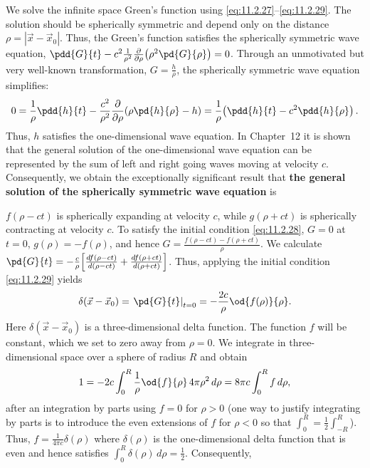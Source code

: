 We solve the infinite space Green's function using \eqref{eq:11.2.27}--\eqref{eq:11.2.29}.  The solution should be spherically symmetric and depend only on the distance $\rho = |\vec{x} - \vec{x}_0|$.  Thus, the Green's function satisfies the spherically symmetric wave equation, $\pdd{G}{t} - c^2 \frac{1}{\rho^2}\frac{\partial}{\partial \rho}\!\left(\rho^2\pd{G}{\rho}\right) = 0$.  Through an unmotivated but very well-known transformation, $G = \frac{h}{\rho}$, the spherically symmetric wave equation simplifies:
\[
0 = \frac{1}{\rho}\pdd{h}{t} - \frac{c^2}{\rho^2}\frac{\partial}{\partial \rho}\!\left(\rho\pd{h}{\rho} - h\right) = \frac{1}{\rho}\!\left(\pdd{h}{t} - c^2\pdd{h}{\rho}\right).
\]
Thus, $h$ satisfies the one-dimensional wave equation.  In Chapter~12 it is shown that the general solution of the one-dimensional wave equation can be represented by the sum of left and right going waves moving at velocity $c$.  Consequently, we obtain the exceptionally significant result that \textbf{the general solution of the spherically symmetric wave equation} is

$f(\rho - ct)$ is spherically expanding at velocity $c$, while $g(\rho + ct)$ is spherically contracting at velocity $c$.  To satisfy the initial condition \eqref{eq:11.2.28}, $G = 0$ at $t = 0$, $g(\rho) = -f(\rho)$, and hence $G = \frac{f(\rho - ct) - f(\rho + ct)}{\rho}$.  We calculate $\pd{G}{t} = -\frac{c}{\rho}\!\left[\frac{df(\rho - ct)}{d(\rho - ct)} + \frac{df(\rho + ct)}{d(\rho + ct)}\right]$.  Thus, applying the initial condition \eqref{eq:11.2.29} yields
\[
\delta(\vec{x} - \vec{x}_0) = \left.\pd{G}{t}\right|_{t=0} = -\frac{2c}{\rho}\od{f(\rho)}{\rho}.
\]
Here $\delta(\vec{x} - \vec{x}_0)$ is a three-dimensional delta function.  The function $f$ will be constant, which we set to zero away from $\rho = 0$.  We integrate in three-dimensional space over a sphere of radius $R$ and obtain
\[
1 = -2c\int_0^R \frac{1}{\rho}\od{f}{\rho}\,4\pi\rho^2\,d\rho = 8\pi c \int_0^R f\,d\rho,
\]
after an integration by parts using $f = 0$ for $\rho > 0$ (one way to justify integrating by parts is to introduce the even extensions of $f$ for $\rho < 0$ so that $\int_0^R = \frac{1}{2}\int_{-R}^R$).  Thus, $f = \frac{1}{4\pi c}\delta(\rho)$ where $\delta(\rho)$ is the one-dimensional delta function that is even and hence satisfies $\int_0^R \delta(\rho)\,d\rho = \frac{1}{2}$.  Consequently,

